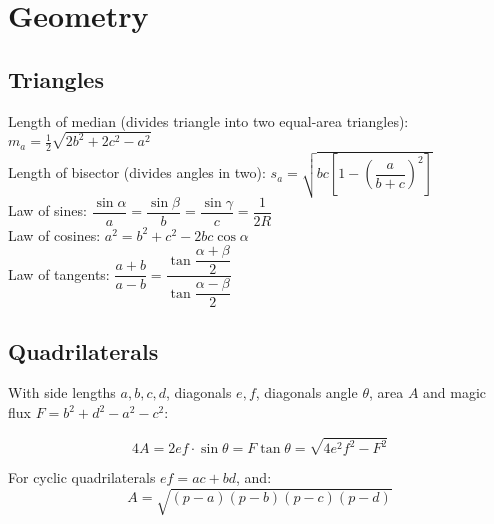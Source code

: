 \section{Geometry}

\subsection{Triangles}

\small
Length of median (divides triangle into two equal-area triangles): $m_a=\tfrac{1}{2}\sqrt{2b^2+2c^2-a^2}$\\
Length of bisector (divides angles in two): $s_a=\sqrt{bc\left[1-\left(\dfrac{a}{b+c}\right)^2\right]}$\\
Law of sines: $\dfrac{\sin\alpha}{a}=\dfrac{\sin\beta}{b}=\dfrac{\sin\gamma}{c}=\dfrac{1}{2R}$\\
Law of cosines: $a^2=b^2+c^2-2bc\cos\alpha$\\
Law of tangents: $\dfrac{a+b}{a-b}=\dfrac{\tan\dfrac{\alpha+\beta}{2}}{\tan\dfrac{\alpha-\beta}{2}}$\\

\subsection{Quadrilaterals}
With side lengths $a,b,c,d$, diagonals $e, f$, diagonals angle $\theta$, area $A$ and
magic flux $F=b^2+d^2-a^2-c^2$:

\[ 4A = 2ef \cdot \sin\theta = F\tan\theta = \sqrt{4e^2f^2-F^2} \]

For cyclic quadrilaterals 
$ef = ac + bd$, and:
\[ A = \sqrt{(p-a)(p-b)(p-c)(p-d)} \]

